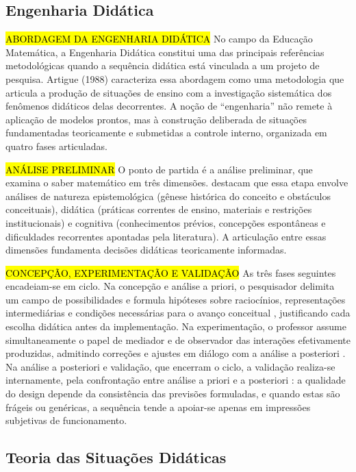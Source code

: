 {\subsection{Engenharia Didática}

\hl {ABORDAGEM DA ENGENHARIA DIDÁTICA} No campo da Educação Matemática, a Engenharia Didática constitui uma das principais referências metodológicas quando a sequência didática está vinculada a um projeto de pesquisa. Artigue (1988) caracteriza essa abordagem como uma metodologia que articula a produção de situações de ensino com a investigação sistemática dos fenômenos didáticos delas decorrentes. A noção de ``engenharia'' não remete à aplicação de modelos prontos, mas à construção deliberada de situações fundamentadas teoricamente e submetidas a controle interno, organizada em quatro fases articuladas.

\hl {ANÁLISE PRELIMINAR} O ponto de partida é a análise preliminar, que examina o saber matemático em três dimensões.  destacam que essa etapa envolve análises de natureza epistemológica (gênese histórica do conceito e obstáculos conceituais), didática (práticas correntes de ensino, materiais e restrições institucionais) e cognitiva (conhecimentos prévios, concepções espontâneas e dificuldades recorrentes apontadas pela literatura). A articulação entre essas dimensões fundamenta decisões didáticas teoricamente informadas.

\hl {CONCEPÇÃO, EXPERIMENTAÇÃO E VALIDAÇÃO} As três fases seguintes encadeiam-se em ciclo. Na concepção e análise a priori, o pesquisador delimita um campo de possibilidades e formula hipóteses sobre raciocínios, representações intermediárias e condições necessárias para o avanço conceitual \cite{almoulouSilva2012}, justificando cada escolha didática antes da implementação. Na experimentação, o professor assume simultaneamente o papel de mediador e de observador das interações efetivamente produzidas, admitindo correções e ajustes em diálogo com a análise a posteriori \cite{almoulouCoutinho2008}. Na análise a posteriori e validação, que encerram o ciclo, a validação realiza-se internamente, pela confrontação entre análise a priori e a posteriori \cite{artigue1996}: a qualidade do design depende da consistência das previsões formuladas, e quando estas são frágeis ou genéricas, a sequência tende a apoiar-se apenas em impressões subjetivas de funcionamento.

\subsection{Teoria das Situações Didáticas}

}
